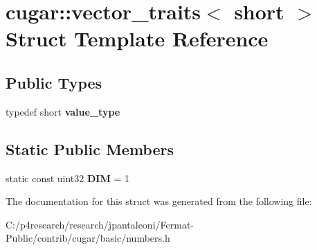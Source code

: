 \hypertarget{structcugar_1_1vector__traits_3_01short_01_4}{}\section{cugar\+:\+:vector\+\_\+traits$<$ short $>$ Struct Template Reference}
\label{structcugar_1_1vector__traits_3_01short_01_4}
\subsection*{Public Types}
\begin{DoxyCompactItemize}
\item 
\mbox{\label{structcugar_1_1vector__traits_3_01short_01_4_a9fb9d10962f0780132b5338295705996}} 
typedef short {\bfseries value\+\_\+type}
\end{DoxyCompactItemize}
\subsection*{Static Public Members}
\begin{DoxyCompactItemize}
\item 
\mbox{\label{structcugar_1_1vector__traits_3_01short_01_4_a495e4f2c78774035e96b01de38321426}} 
static const uint32 {\bfseries D\+IM} = 1
\end{DoxyCompactItemize}


The documentation for this struct was generated from the following file\+:\begin{DoxyCompactItemize}
\item 
C\+:/p4research/research/jpantaleoni/\+Fermat-\/\+Public/contrib/cugar/basic/numbers.\+h\end{DoxyCompactItemize}
